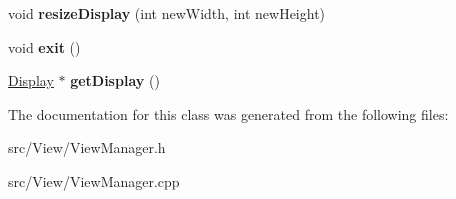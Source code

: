 \begin{DoxyCompactItemize}
\item 
void {\bfseries resize\+Display} (int new\+Width, int new\+Height)\hypertarget{classViewManager_a32c0f403834b720da90683066be6facc}{}\label{classViewManager_a32c0f403834b720da90683066be6facc}

\item 
void {\bfseries exit} ()\hypertarget{classViewManager_a06d7d534bc170365d39b4dba37f09005}{}\label{classViewManager_a06d7d534bc170365d39b4dba37f09005}

\item 
\hyperlink{classDisplay}{Display} $\ast$ {\bfseries get\+Display} ()\hypertarget{classViewManager_a7758c09a2eb1ddb2c43292f5e441991e}{}\label{classViewManager_a7758c09a2eb1ddb2c43292f5e441991e}

\end{DoxyCompactItemize}


The documentation for this class was generated from the following files\+:\begin{DoxyCompactItemize}
\item 
src/\+View/View\+Manager.\+h\item 
src/\+View/View\+Manager.\+cpp\end{DoxyCompactItemize}
